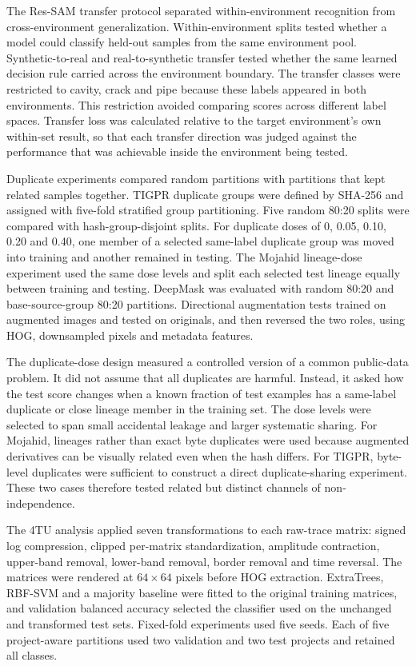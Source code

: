 \documentclass[]{interact}
\begin{document}
The Res-SAM transfer protocol separated within-environment recognition from cross-environment generalization. Within-environment splits tested whether a model could classify held-out samples from the same environment pool. Synthetic-to-real and real-to-synthetic transfer tested whether the same learned decision rule carried across the environment boundary. The transfer classes were restricted to cavity, crack and pipe because these labels appeared in both environments. This restriction avoided comparing scores across different label spaces. Transfer loss was calculated relative to the target environment's own within-set result, so that each transfer direction was judged against the performance that was achievable inside the environment being tested.

Duplicate experiments compared random partitions with partitions that kept related samples together. TIGPR duplicate groups were defined by SHA-256 and assigned with five-fold stratified group partitioning. Five random 80:20 splits were compared with hash-group-disjoint splits. For duplicate doses of 0, 0.05, 0.10, 0.20 and 0.40, one member of a selected same-label duplicate group was moved into training and another remained in testing. The Mojahid lineage-dose experiment used the same dose levels and split each selected test lineage equally between training and testing. DeepMask was evaluated with random 80:20 and base-source-group 80:20 partitions. Directional augmentation tests trained on augmented images and tested on originals, and then reversed the two roles, using HOG, downsampled pixels and metadata features.

The duplicate-dose design measured a controlled version of a common public-data problem. It did not assume that all duplicates are harmful. Instead, it asked how the test score changes when a known fraction of test examples has a same-label duplicate or close lineage member in the training set. The dose levels were selected to span small accidental leakage and larger systematic sharing. For Mojahid, lineages rather than exact byte duplicates were used because augmented derivatives can be visually related even when the hash differs. For TIGPR, byte-level duplicates were sufficient to construct a direct duplicate-sharing experiment. These two cases therefore tested related but distinct channels of non-independence.

The 4TU analysis applied seven transformations to each raw-trace matrix: signed log compression, clipped per-matrix standardization, amplitude contraction, upper-band removal, lower-band removal, border removal and time reversal. The matrices were rendered at $64\times64$ pixels before HOG extraction. ExtraTrees, RBF-SVM and a majority baseline were fitted to the original training matrices, and validation balanced accuracy selected the classifier used on the unchanged and transformed test sets. Fixed-fold experiments used five seeds. Each of five project-aware partitions used two validation and two test projects and retained all classes.
\end{document}
